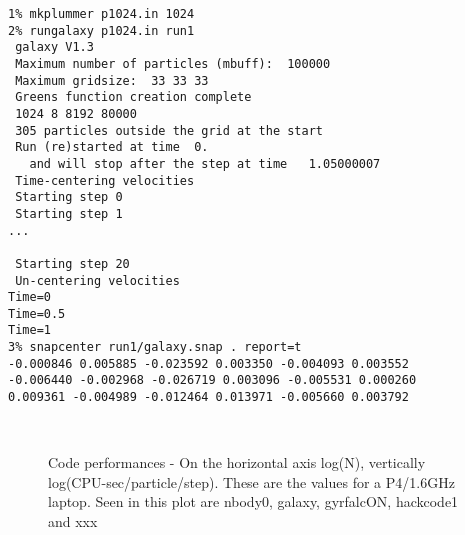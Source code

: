 \footnotesize\begin{verbatim}
1% mkplummer p1024.in 1024
2% rungalaxy p1024.in run1
 galaxy V1.3 
 Maximum number of particles (mbuff):  100000
 Maximum gridsize:  33 33 33
 Greens function creation complete
 1024 8 8192 80000
 305 particles outside the grid at the start
 Run (re)started at time  0.
   and will stop after the step at time   1.05000007
 Time-centering velocities
 Starting step 0
 Starting step 1
...

 Starting step 20
 Un-centering velocities
Time=0
Time=0.5
Time=1
3% snapcenter run1/galaxy.snap . report=t
-0.000846 0.005885 -0.023592 0.003350 -0.004093 0.003552 
-0.006440 -0.002968 -0.026719 0.003096 -0.005531 0.000260 
0.009361 -0.004989 -0.012464 0.013971 -0.005660 0.003792 



\end{verbatim}\normalsize

\begin{figure}[htb]
\caption[Code Performances]
{Code performances - On the horizontal axis log(N), vertically log(CPU-sec/particle/step).
These are the values for a P4/1.6GHz laptop. Seen in this plot
are nbody0, galaxy, gyrfalcON, hackcode1 and xxx}
\label{f:performance}
\end{figure}


